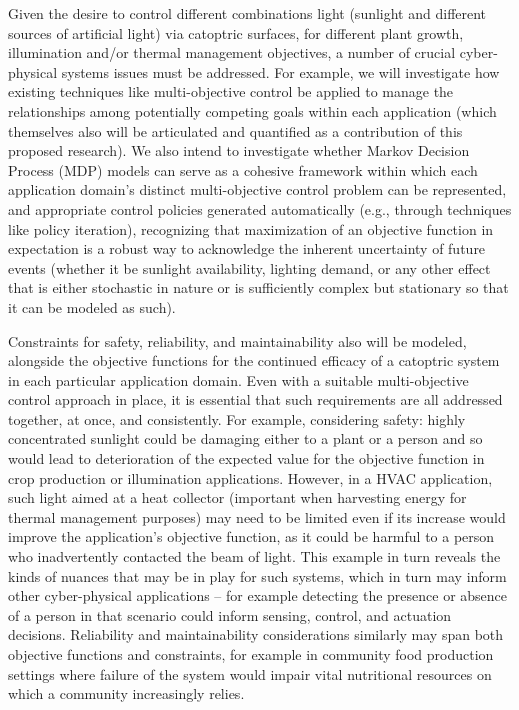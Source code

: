Given the desire to control different combinations light (sunlight and
different sources of artificial light) via catoptric surfaces, for different
plant growth, illumination and/or thermal management objectives, a number of
crucial cyber-physical systems issues must be addressed.  For example, we will
investigate how existing techniques like multi-objective control be applied to
manage the relationships among potentially competing goals within each
application (which themselves also will be articulated and quantified as a
contribution of this proposed research). We also intend to investigate whether
Markov Decision Process (MDP) models can serve as a cohesive framework within
which each application domain's distinct multi-objective control problem can be
represented, and appropriate control policies generated automatically (e.g.,
through techniques like policy iteration), recognizing that maximization of an
objective function in expectation is a robust way to acknowledge the inherent
uncertainty of future events (whether it be sunlight availability, lighting
demand, or any other effect that is either stochastic in nature or is
sufficiently complex but stationary so that it can be modeled as such).

Constraints for safety, reliability, and maintainability also will be modeled,
alongside the objective functions for the continued efficacy of a catoptric
system in each particular application domain.  Even with a suitable
multi-objective control approach in place, it is essential that such
requirements are all addressed together, at once, and consistently. For
example, considering safety: highly concentrated sunlight could be damaging
either to a plant or a person and so would lead to deterioration of the
expected value for the objective function in crop production or illumination
applications.  However, in a HVAC application, such light aimed at a heat
collector (important when harvesting energy for thermal management purposes)
may need to be limited even if its increase would improve the application's
objective function, as it could be harmful to a person who inadvertently
contacted the beam of light.  This example in turn reveals the kinds of nuances
that may be in play for such systems, which in turn may inform other
cyber-physical applications -- for example detecting the presence or absence of
a person in that scenario could inform sensing, control, and actuation
decisions.  Reliability and maintainability considerations similarly may span
both objective functions and constraints, for example in community food
production settings where failure of the system would impair vital nutritional
resources on which a community increasingly relies.

